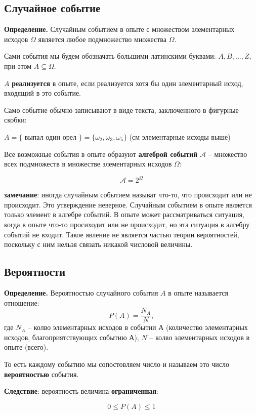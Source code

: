 \documentclass{article}
\begin{document}
\subsection{Случайное событие}

\textbf{Определение.} Случайным событием в опыте с множеством элементарных исходов $\Omega$ является любое подмножество множества $\Omega$.

Сами события мы будем обозначать большими латинскими буквами: $A, B, ..., Z$, при этом $A \subseteq \Omega$.

$A$ \textbf{реализуется} в опыте, если реализуется хотя бы один элементарный исход, входящий в это событие.

Само событие обычно записывают в виде текста, заключенного в фигурные скобки:

$A = \{$ выпал один орел $\} = \{\omega_2, \omega_3, \omega_5\}$ (см элементарные исходы выше)

Все возможные события в опыте образуют \textbf{алгеброй событий} $\mathcal{A}$ -- множество всех подмножеств в множестве элементарных исходов $\Omega$:

$$ \mathcal{A} = 2^{\Omega} $$

\textbf{замечание}: иногда случайным событием называт что-то, что происходит или не происходит. Это утверждение неверное. Случайным событием в опыте является только элемент в алгебре событий.
В опыте может рассматриваться ситуация, когда в опыте что-то просиходит или не происходит, но эта ситуация в алгебру событий не входит. Такое явление не является частью теории вероятностей, поскольку с ним нельзя связать никакой числовой величины.

\subsection{Вероятности}

\textbf{Определение.} Вероятностью случайного события $A$ в опыте называется отношение:
$$ P(A) = \frac{N_A}{N},$$
где $N_A$ -- колво элементарных исходов в событии А (количество элементарных исходов, благоприятствующих событию А),
$N$ -- колво элементарных исходов в опыте (всего).

То есть каждому событию мы сопостовляем число и называем это число \textbf{вероятностью} события.

\textbf{Следствие}: вероятность величина \textbf{ограниченная}:

$$ 0 \leq P(A) \leq 1 $$

\quad
\end{document}
